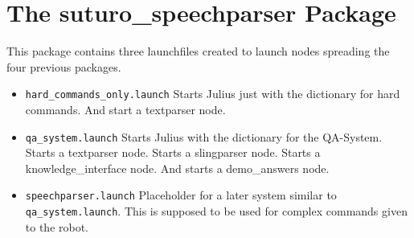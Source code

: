 \documentclass[main.tex]{subfiles}
\begin{document}
    
\section{The suturo\_speechparser Package}
    This package contains three launchfiles created to launch nodes spreading the four previous packages.\\
    \begin{itemize}
        \item \texttt{hard\_commands\_only.launch}
            \subitem Starts Julius just with the dictionary for hard commands.
            \subitem And start a textparser node.
        \item \texttt{qa\_system.launch}
            \subitem Starts Julius with the dictionary for the QA-System.
            \subitem Starts a textparser node.
            \subitem Starts a slingparser node.
            \subitem Starts a knowledge\_interface node.
            \subitem And starts a demo\_answers node.        
        \item \texttt{speechparser.launch}
            \subitem Placeholder for a later system similar to \texttt{qa\_system.launch}. This is supposed to be used for complex commands given to the robot.  
        
    \end{itemize}
     
    	
\end{document}
